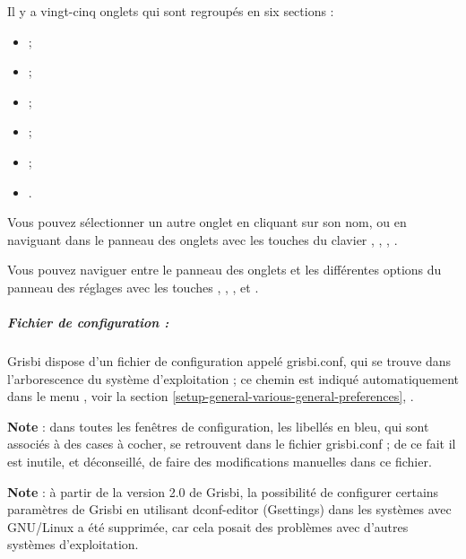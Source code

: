 Il y a vingt-cinq onglets qui sont regroupés en six sections :
\begin{itemize}
	\item {} ;
	\item {} ;
	\item {} ;
	\item {} ;
	\item {} ;
	\item {}.
\end{itemize}


Vous pouvez sélectionner un autre onglet en cliquant sur son nom, ou en naviguant dans le panneau des onglets avec les touches du clavier   , , , .


Vous pouvez naviguer entre le panneau des onglets et les différentes options du panneau des réglages avec les touches , , ,  et .



\subparagraph{Fichier de configuration :\label{setup-conffile}}


Grisbi dispose d'un fichier de configuration appelé grisbi.conf, qui se trouve dans l'arborescence du système d'exploitation ; ce chemin est indiqué automatiquement dans le menu , voir la section \vref{setup-general-various-general-preferences}, .



\textbf{Note} : dans toutes les fenêtres de configuration, les libellés en bleu, qui sont associés à des cases à cocher, se retrouvent dans le fichier grisbi.conf ; de ce fait il est inutile, et déconseillé, de faire des modifications manuelles dans ce fichier.


\textbf{Note} : à partir de la version 2.0 de Grisbi, la possibilité de configurer certains paramètres de Grisbi en utilisant dconf-editor (Gsettings) dans les systèmes avec GNU/Linux a été supprimée, car cela posait des problèmes avec d'autres systèmes d'exploitation.


